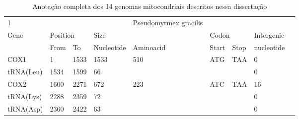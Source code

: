 \documentclass[../DISSERTACAO_MAIN.tex]{subfiles}
\begin{document}
	\centering
	\begin{longtable}{llllllllllllllllllllll}
		\caption{Anotação completa dos 14 genomas mitocondriais descritos nessa dissertação}\label{tab:s1}\\
			1            & \multicolumn{2}{l}{}        & \multicolumn{2}{l}{}        & \multicolumn{2}{l}{}            & \multicolumn{3}{l}{Pseudomyrmex 				gracilis} & \multicolumn{3}{l}{}      & \multicolumn{3}{l}{}        & \multicolumn{3}{l}{}            & \multicolumn{3}{l}{}         \\
			Gene         & \multicolumn{4}{l}{Position}                              & \multicolumn{5}{l}{Size}                                                        & \multicolumn{6}{l}{Codon}                               & \multicolumn{3}{l}{Intergenic}  & \multicolumn{3}{l}{}         \\
			& \multicolumn{2}{l}{From}    & \multicolumn{2}{l}{To}      & \multicolumn{2}{l}{Nucleotide}  & \multicolumn{3}{l}{Aminoacid}                 & \multicolumn{3}{l}{Start} & \multicolumn{3}{l}{Stop}    & \multicolumn{3}{l}{nucleotide}  & \multicolumn{3}{l}{}         \\
			COX1         & \multicolumn{2}{l}{1}       & \multicolumn{2}{l}{1533}    & \multicolumn{2}{l}{1533}        & \multicolumn{3}{l}{510}                       & \multicolumn{3}{l}{ATG}   & \multicolumn{3}{l}{TAA}     & \multicolumn{3}{l}{0}           & \multicolumn{3}{l}{}         \\
			tRNA(Leu)    & \multicolumn{2}{l}{1534}    & \multicolumn{2}{l}{1599}    & \multicolumn{2}{l}{66}          & \multicolumn{3}{l}{}                          & \multicolumn{3}{l}{}      & \multicolumn{3}{l}{}        & \multicolumn{3}{l}{0}           & \multicolumn{3}{l}{}         \\
			COX2         & \multicolumn{2}{l}{1600}    & \multicolumn{2}{l}{2271}    & \multicolumn{2}{l}{672}         & \multicolumn{3}{l}{223}                       & \multicolumn{3}{l}{ATC}   & \multicolumn{3}{l}{TAA}     & \multicolumn{3}{l}{16}          & \multicolumn{3}{l}{}         \\
			tRNA(Lys)    & \multicolumn{2}{l}{2288}    & \multicolumn{2}{l}{2359}    & \multicolumn{2}{l}{72}          & \multicolumn{3}{l}{}                          & \multicolumn{3}{l}{}      & \multicolumn{3}{l}{}        & \multicolumn{3}{l}{0}           & \multicolumn{3}{l}{}         \\
			tRNA(Asp)    & \multicolumn{2}{l}{2360}    & \multicolumn{2}{l}{2422}    & \multicolumn{2}{l}{63}          & \multicolumn{3}{l}{}                          & \multicolumn{3}{l}{}      & \multicolumn{3}{l}{}        & \multicolumn{3}{l}{0}           & \multicolumn{3}{l}{}         \\

\end{longtable}
\end{document}
